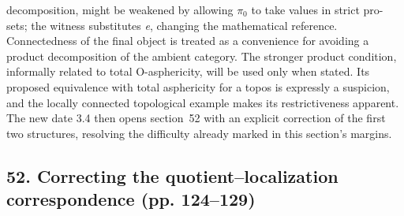 decomposition, might be weakened by allowing $\pi_0$ to take values in strict pro-sets; the witness substitutes \emph{e}, changing the mathematical reference. Connectedness of the final object is treated as a convenience for avoiding a product decomposition of the ambient category. The stronger product condition, informally related to total O-asphericity, will be used only when stated. Its proposed equivalence with total asphericity for a topos is expressly a suspicion, and the locally connected topological example makes its restrictiveness apparent. The new date 3.4 then opens section~52 with an explicit correction of the first two structures, resolving the difficulty already marked in this section's margins.

\subsection*{52. Correcting the quotient--localization correspondence (pp. 124--129)}
